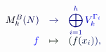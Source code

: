 \documentclass[12pt]{article}
\begin{document}
\makeatletter
\renewcommand*{\@textcolor}[3]{%
  \protect\leavevmode
  \begingroup
    \color#1{#2}#3%
  \endgroup
}
\makeatother
\begin{displaymath}
\begin{array} {rcl} { { { \mathcolor[RGB]{0,0,15}{M} _ { \mathcolor[RGB]{0,0,30}{k} } ^ { \mathcolor[RGB]{0,0,45}{B} } \mathcolor[RGB]{0,0,60}{(} \mathcolor[RGB]{0,0,75}{N} \mathcolor[RGB]{0,0,90}{)} } } } & { { { \mathcolor[RGB]{0,0,105}{\to} } } } & { { { \displaystyle \mathcolor[RGB]{0,0,120}{\bigoplus} _ { \mathcolor[RGB]{0,0,135}{i} \mathcolor[RGB]{0,0,150}{=} \mathcolor[RGB]{0,0,165}{1} } ^ { \mathcolor[RGB]{0,0,180}{h} } \mathcolor[RGB]{0,0,195}{V} _ { \mathcolor[RGB]{0,0,210}{k} } ^ { \mathcolor[RGB]{0,0,225}{\Gamma} _ { \mathcolor[RGB]{0,0,240}{i} } } } } } \\ { { { \mathcolor[RGB]{0,0,255}{f} } } } & { { { \mathcolor[RGB]{0,15,0}{\mapsto} } } } & { { { \mathcolor[RGB]{0,15,15}{(} \mathcolor[RGB]{0,15,30}{f} \mathcolor[RGB]{0,15,45}{(} \mathcolor[RGB]{0,15,60}{x} _ { \mathcolor[RGB]{0,15,75}{i} } \mathcolor[RGB]{0,15,90}{)} \mathcolor[RGB]{0,15,105}{)} \mathcolor[RGB]{0,15,120}{,} } } } \end{array}
\end{displaymath}
\end{document}
